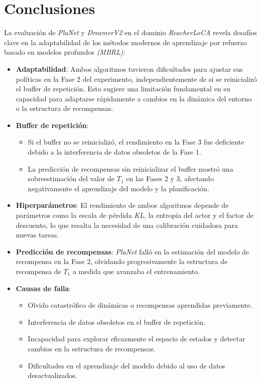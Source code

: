 \section{Conclusiones}\label{sec:conclusiones}

La evaluación de \textit{PlaNet} y \textit{DreamerV2} en el dominio \textit{ReacherLoCA} revela desafíos clave en la adaptabilidad de los métodos modernos de aprendizaje por refuerzo basado en modelos profundos \textit{(MBRL)}:

\begin{itemize}
    \item \textbf{Adaptabilidad}: Ambos algoritmos tuvieron dificultades para ajustar sus políticas en la Fase 2 del experimento, independientemente de si se reinicializó el buffer de repetición.
    Esto sugiere una limitación fundamental en su capacidad para adaptarse rápidamente a cambios en la dinámica del entorno o la estructura de recompensas.
    \item \textbf{Buffer de repetición}:
    \begin{itemize}
        \item Si el buffer no se reinicializó, el rendimiento en la Fase 3 fue deficiente debido a la interferencia de datos obsoletos de la Fase 1.
        \item La predicción de recompensas sin reinicializar el buffer mostró una sobreestimación del valor de $T_1$ en las Fases 2 y 3, afectando negativamente el aprendizaje del modelo y la planificación.
    \end{itemize}
    \item \textbf{Hiperparámetros}: El rendimiento de ambos algoritmos depende de parámetros como la escala de pérdida \textit{KL}, la entropía del actor y el factor de descuento, lo que resalta la necesidad de una calibración cuidadosa para nuevas tareas.
    \item \textbf{Predicción de recompensas}: \textit{PlaNet} falló en la estimación del modelo de recompensa en la Fase 2, olvidando progresivamente la estructura de recompensa de $T_1$ a medida que avanzaba el entrenamiento.
    \item \textbf{Causas de falla}:
    \begin{itemize}
        \item Olvido catastrófico de dinámicas o recompensas aprendidas previamente.
        \item Interferencia de datos obsoletos en el buffer de repetición.
        \item Incapacidad para explorar eficazmente el espacio de estados y detectar cambios en la estructura de recompensas.
        \item Dificultades en el aprendizaje del modelo debido al uso de datos desactualizados.
    \end{itemize}
\end{itemize}

